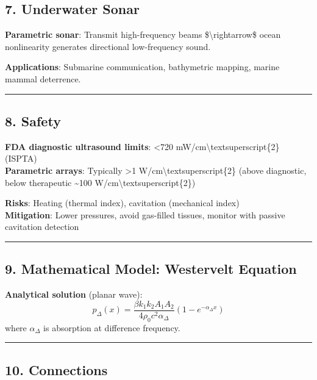 \subsection{\texorpdfstring{7. Underwater Sonar
}{7. Underwater Sonar }}\label{underwater-sonar}

\textbf{Parametric sonar}: Transmit high-frequency beams
\$\textbackslash rightarrow\$ ocean nonlinearity generates directional
low-frequency sound.

\textbf{Applications}: Submarine communication, bathymetric mapping,
marine mammal deterrence.

\begin{center}\rule{0.5\linewidth}{0.5pt}\end{center}

\subsection{8. Safety}\label{safety}

\textbf{FDA diagnostic ultrasound limits}: \textless720
mW/cm\textbackslash textsuperscript\{2\} (ISPTA)\\
\textbf{Parametric arrays}: Typically \textgreater1
W/cm\textbackslash textsuperscript\{2\} (above diagnostic, below
therapeutic \textasciitilde100 W/cm\textbackslash textsuperscript\{2\})

\textbf{Risks}: Heating (thermal index), cavitation (mechanical index)\\
\textbf{Mitigation}: Lower pressures, avoid gas-filled tissues, monitor
with passive cavitation detection

\begin{center}\rule{0.5\linewidth}{0.5pt}\end{center}

\subsection{9. Mathematical Model: Westervelt
Equation}\label{mathematical-model-westervelt-equation}

\textbf{Analytical solution} (planar wave):
\[p_\Delta(x) = \frac{\beta k_1 k_2 A_1 A_2}{4 \rho_0 c^2 \alpha_\Delta} \left(1 - e^{-\alpha_\Delta x}\right)\]
where \(\alpha_\Delta\) is absorption at difference frequency.

\begin{center}\rule{0.5\linewidth}{0.5pt}\end{center}

\subsection{10. Connections}\label{connections}

